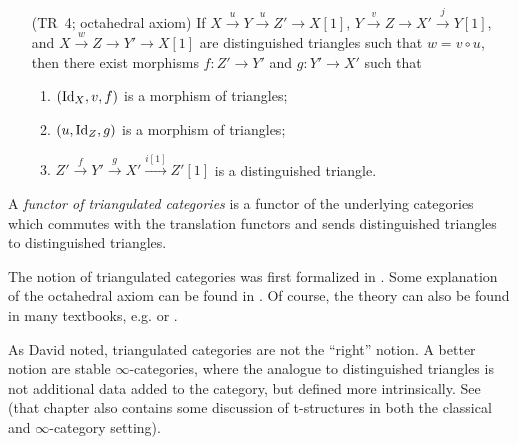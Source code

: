 \documentclass[english]{short-notes}
\begin{document}
\begin{Def}
\begin{enumerate}
            \item[(TR~4; octahedral axiom)]
                If $X \xrightarrow{u} Y \xrightarrow{u} Z' → X[1]$,
                $Y \xrightarrow{v} Z \xrightarrow{} X' \xrightarrow{j} Y[1]$, and
                $X \xrightarrow{w} Z \xrightarrow{} Y' \xrightarrow{} X[1]$
                are distinguished triangles such that $w = v∘u$, then there exist morphisms $f\colon Z' → Y'$ and $g\colon Y' → X'$ such that
                \begin{enumerate}[1)]
                    \item $(\id[X],v,f)$ is a morphism of triangles;
                    \item $(u, \id[Z],g)$ is a morphism of triangles;
                    \item $Z' \xrightarrow{f} Y' \xrightarrow{g} X' \xrightarrow{i[1]} Z'[1]$ is a distinguished triangle.
                \end{enumerate}
    \end{enumerate}
    A \emph{functor of triangulated categories} is a functor of the underlying categories which commutes with the translation functors and sends distinguished triangles to distinguished triangles.
\end{Def}

The notion of triangulated categories was first formalized in \cite{Verdier:1977:CategoriesDerivees}.
Some explanation of the octahedral axiom can be found in \cite[Section~1.1]{BeilinsonBernsteinDeligne:1982:FaisceauxPervers}.
Of course, the theory can also be found in many textbooks, e.g. \cite{KashiwaraSchapira:2006:CategoriesAndSheaves} or \cite{Weibel:1994:IntroToHomologicalAlgebra}.

\begin{Rem}
    As David noted, triangulated categories are not the \enquote{right} notion.
    A better notion are stable $\infty$-categories, where the analogue to distinguished triangles is not additional data added to the category, but defined more intrinsically.
    See \cite[Chapter 1]{Lurie:2011-draft:HigherAlgebra} (that chapter also contains some discussion of t-structures in both the classical and $\infty$-category setting).
\end{Rem}
\end{document}
